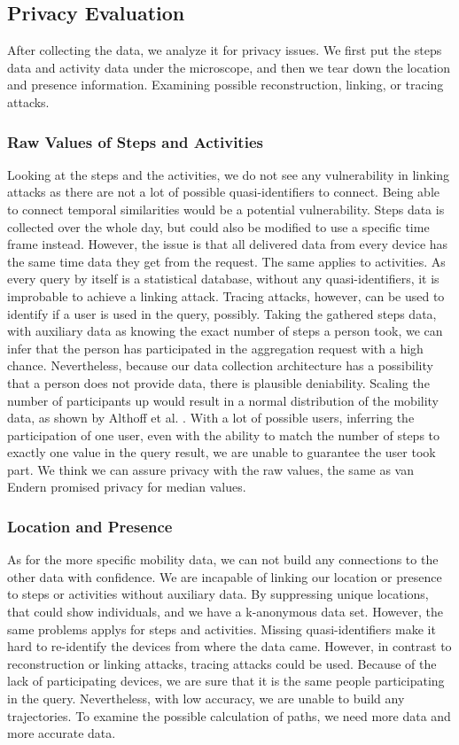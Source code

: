 \subsection{Privacy Evaluation}
After collecting the data, we analyze it for privacy issues. We first put the steps data and activity data under the microscope, and then we tear down the location and presence information. Examining possible reconstruction, linking, or tracing attacks.

\subsubsection{Raw Values of Steps and Activities}
Looking at the steps and the activities, we do not see any vulnerability in linking attacks as there are not a lot of possible quasi-identifiers to connect. Being able to connect temporal similarities would be a potential vulnerability. Steps data is collected over the whole day, but could also be modified to use a specific time frame instead. However, the issue is that all delivered data from every device has the same time data they get from the request. The same applies to activities. As every query by itself is a statistical database, without any quasi-identifiers, it is improbable to achieve a linking attack. 
Tracing attacks, however, can be used to identify if a user is used in the query, possibly. Taking the gathered steps data, with auxiliary data as knowing the exact number of steps a person took, we can infer that the person has participated in the aggregation request with a high chance. Nevertheless, because our data collection architecture has a possibility that a person does not provide data, there is plausible deniability. Scaling the number of participants up would result in a normal distribution of the mobility data, as shown by Althoff et al. \cite{inequality}. With a lot of possible users, inferring the participation of one user, even with the ability to match the number of steps to exactly one value in the query result, we are unable to guarantee the user took part. We think we can assure privacy with the raw values, the same as van Endern promised privacy for median values.

\subsubsection{Location and Presence}
As for the more specific mobility data, we can not build any connections to the other data with confidence. We are incapable of linking our location or presence to steps or activities without auxiliary data. By suppressing unique locations, that could show individuals, and we have a k-anonymous data set. However, the same problems applys for steps and activities. Missing quasi-identifiers make it hard to re-identify the devices from where the data came. 
However, in contrast to reconstruction or linking attacks, tracing attacks could be used. Because of the lack of participating devices, we are sure that it is the same people participating in the query. Nevertheless, with low accuracy, we are unable to build any trajectories. To examine the possible calculation of paths, we need more data and more accurate data.

